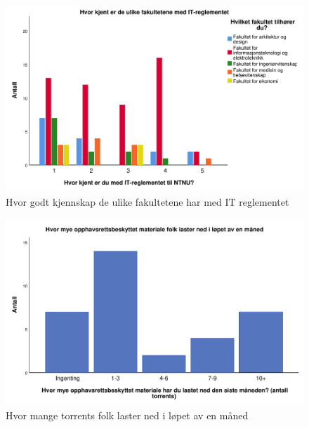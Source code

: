 \begin{figure}[H]
    \centering
    \includegraphics[scale=0.45]{case_1/bilder/reglement_fakultet.pdf}
    \caption[reglement-fakultet]{Hvor godt kjennskap de ulike fakultetene har med IT reglementet}
    \label{fig:reglement-fakultet}
\end{figure}

\begin{figure}[H]
    \centering
    \includegraphics[scale=0.45]{case_1/bilder/antalltorrents.pdf}
    \caption[antalltorrents]{Hvor mange torrents folk laster ned i løpet av en måned}
    \label{fig:antalltorrents}
\end{figure}
